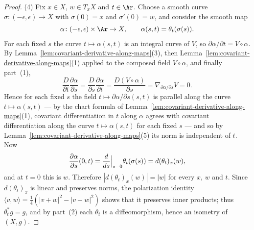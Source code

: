 \begin{proof}
(4) Fix $x\in X$, $w\in T_xX$ and $t\in\Ar$. Choose a smooth curve
$\sigma\colon(-\epsilon,\epsilon)\to X$ with $\sigma(0)=x$ and
$\sigma'(0)=w$, and consider the smooth map
$$\alpha\colon(-\epsilon,\epsilon)\times\Ar\to X,\qquad
\alpha(s,t)=\theta_t(\sigma(s)).$$
For each fixed $s$ the curve $t\mapsto\alpha(s,t)$ is an integral curve
of $V$, so $\partial\alpha/\partial t=V\circ\alpha$. By
Lemma~\ref{lem:covariant-derivative-along-maps}(3), then
Lemma~\ref{lem:covariant-derivative-along-maps}(1) applied to the
composed field $V\circ\alpha$, and finally part~(1),
$$\frac{D}{\partial t}\frac{\partial\alpha}{\partial s}
=\frac{D}{\partial s}\frac{\partial\alpha}{\partial t}
=\frac{D(V\circ\alpha)}{\partial s}
=\nabla_{\partial\alpha/\partial s}V=0 .$$
Hence for each fixed $s$ the field $t\mapsto\partial\alpha/\partial
s(s,t)$ is parallel along the curve $t\mapsto\alpha(s,t)$ --- by the
chart formula of Lemma~\ref{lem:covariant-derivative-along-maps}(1),
covariant differentiation in $t$ along $\alpha$ agrees with covariant
differentiation along the curve $t\mapsto\alpha(s,t)$ for each fixed
$s$ --- and so by Lemma~\ref{lem:covariant-derivative-along-maps}(5)
its norm is independent of $t$. Now
$$\frac{\partial\alpha}{\partial s}(0,t)
=\frac{d}{ds}\Bigl|_{s=0}\Bigr.\theta_t(\sigma(s))
=d(\theta_t)_x(w),$$
and at $t=0$ this is $w$. Therefore
$\left|d(\theta_t)_x(w)\right|=|w|$ for every $x$, $w$ and $t$. Since
$d(\theta_t)_x$ is linear and preserves norms, the polarization identity
$\langle v,w\rangle=\frac14\left(|v+w|^2-|v-w|^2\right)$ shows that it
preserves inner products; thus $\theta_t^*g=g$, and by part~(2) each
$\theta_t$ is a diffeomorphism, hence an isometry of $(X,g)$.
\end{proof}

